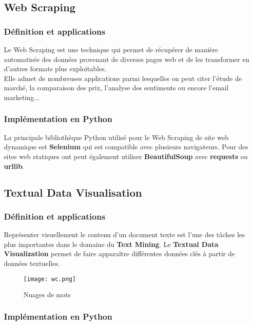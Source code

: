 \documentclass[a4paper,french,12pt]{article}
\begin{document}
\subsection{Web Scraping}

\subsubsection{Définition et applications}

Le Web Scraping est une technique qui permet de récupérer de manière automatisée des données provenant de diverses pages web et de les transformer en d’autres formats plus exploitables.\\

Elle admet de nombreuses applications parmi lesquelles on peut citer l'étude de marché, la comparaison des prix, l'analyse des sentiments ou encore l'email marketing...

\subsubsection{Implémentation en Python}

La principale bibliothèque Python utilisé pour le Web Scraping de site web dynamique est \textbf{Selenium} qui est compatible avec plusieurs navigateurs. Pour des sites web statiques ont peut également utiliser \textbf{BeautifulSoup} avec \textbf{requests} ou \textbf{urllib}.

\subsection{Textual Data Visualisation}

\subsubsection{Définition et applications}

Représenter visuellement le contenu d'un document texte est l'une des tâches les plus importantes dans le domaine du \textbf{Text Mining}. Le \textbf{Textual Data Visualization} permet de faire apparaître différentes données clés à partir de données textuelles.

\begin{figure}[!h]
    \centering
    \texttt{[image: wc.png]}
    \caption{Nuages de mots}
\end{figure}

\subsubsection{Implémentation en Python}
\end{document}
